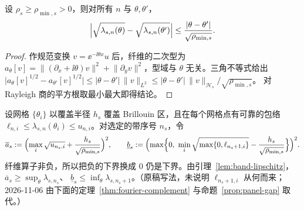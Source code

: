 \begin{lemma}
  \label{lem:band-lipschitz}
  设 $\rho_s\geq\rho_{\min,s}>0$，则对所有 $n$ 与 $\theta,\theta'$，
  \begin{align}
    \Bigl\lvert\sqrt{\lambda_{s,n}(\theta)}-\sqrt{\lambda_{s,n}(\theta')}\Bigr\rvert
    \leq\frac{\lvert\theta-\theta'\rvert}{\sqrt{\rho_{\min,s}}}.
    \label{eq:band-lipschitz}
  \end{align}
\end{lemma}

\begin{proof}
  作规范变换 $v=\ee^{-\ii\theta x}u$ 后，纤维的二次型为
  $a_\theta[v]=\lVert(\partial_x+\ii\theta)v\rVert^2+\lVert\partial_yv\rVert^2$，型域与
  $\theta$ 无关。三角不等式给出
  $\lvert a_\theta[v]^{1/2}-a_{\theta'}[v]^{1/2}\rvert\leq\lvert\theta-\theta'\rvert\,\lVert v\rVert_{L^2}
  \leq\lvert\theta-\theta'\rvert\,\lVert v\rVert_{\mathcal H_s}/\sqrt{\rho_{\min,s}}$。
  对 Rayleigh 商的平方根取最小最大即得结论。
\end{proof}

\begin{workonly}
设网格 $\{\theta_i\}$ 以覆盖半径 $h_s$ 覆盖 Brillouin 区，且在每个网格点有可靠的包络
$\ell_{n,i}\leq\lambda_{s,n}(\theta_i)\leq u_{n,i}$。对选定的带序号 $n_s$，令
\begin{align*}
  \overline a_s:=\Bigl(\max_i\sqrt{u_{n_s,i}}+\frac{h_s}{\sqrt{\rho_{\min,s}}}\Bigr)^2,\qquad
  \underline b_s:=\Bigl(\max\Bigl\{0,\ \min_i\sqrt{\max\{0,\ell_{n_s+1,i}\}}-\frac{h_s}{\sqrt{\rho_{\min,s}}}\Bigr\}\Bigr)^2 .
\end{align*}
纤维算子非负，所以把负的下界换成 $0$ 仍是下界。由引理~\ref{lem:band-lipschitz}，$\overline a_s\geq\sup_\theta\lambda_{s,n_s}$、
$\underline b_s\leq\inf_\theta\lambda_{s,n_s+1}$。（原稿写法，未说明 $\ell_{n_s+1,i}$ 从何而来；
2026-11-06 由下面的定理~\ref{thm:fourier-complement} 与命题~\ref{prop:panel-gap} 取代。）
\end{workonly}

